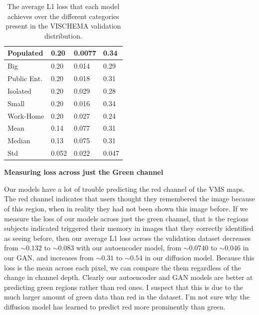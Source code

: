 \documentclass{UoYCSproject}
\begin{document}
\begin{table}[ht]
\begin{tabular}{|l|lll|}
        Populated              & \multicolumn{1}{l|}{0.20}        & \multicolumn{1}{l|}{0.0077}& 0.34                                   \\ \hline
        Big                    & \multicolumn{1}{l|}{0.20}        & \multicolumn{1}{l|}{0.014}& 0.29                                    \\ \hline
        Public Ent.            & \multicolumn{1}{l|}{0.20}        & \multicolumn{1}{l|}{0.018}& 0.31                                    \\ \hline
        Isolated               & \multicolumn{1}{l|}{0.20}        & \multicolumn{1}{l|}{0.029}& 0.28                                    \\ \hline
        Small                  & \multicolumn{1}{l|}{0.20}        & \multicolumn{1}{l|}{0.016}& 0.34                                    \\ \hline
        Work-Home              & \multicolumn{1}{l|}{0.20}        & \multicolumn{1}{l|}{0.027}& 0.24                                    \\ \hline
        \hline
        Mean                   & \multicolumn{1}{l|}{0.14}        & \multicolumn{1}{l|}{0.077}& 0.31                                    \\ \hline
        Median                 & \multicolumn{1}{l|}{0.13}        & \multicolumn{1}{l|}{0.075}& 0.31                                    \\ \hline
        Std                    & \multicolumn{1}{l|}{0.052}       & \multicolumn{1}{l|}{0.022}& 0.047                                   \\ \hline
    \end{tabular}
    \label{tab:categories}
    \caption{The average L1 loss that each model achieves over the different categories present in the VISCHEMA validation distribution.}
\end{table}

\textbf{Measuring loss across just the Green channel}

Our models have a lot of trouble predicting the red channel of the VMS maps. The red channel indicates that users thought they remembered the image because of this region, when in reality they had not been shown this image before. If we measure the loss of our models across just the green channel, that is the regions subjects indicated triggered their memory in images that they correctly identified as seeing before, 
then our average L1 loss across the validation dataset decreases from \( \sim 0.132 \) to \(\sim 0.083\) with our autoencoder model, 
from \( \sim 0.0740 \) to \(\sim 0.046 \)  in our GAN, 
and increases from \(\sim 0.31 \) to \(\sim 0.54 \) in our diffusion model.
Because this loss is the mean across each pixel, we can compare the them regardless of the change in channel depth. Clearly our autoencoder and GAN models are better at predicting green regions rather than red ones. I suspect that this is due to the much larger amount of green data than red in the dataset. I'm not sure why the diffusion model has learned to predict red more prominently than green.
\end{document}
